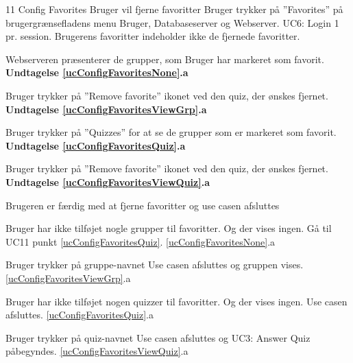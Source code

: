 
\uchead
	{11}
	{Config Favorites}
	{Bruger vil fjerne favoritter}
	{Bruger trykker på ''Favorites'' på brugergrænsefladens menu}
	{Bruger, Databaseserver og Webserver.}
	{UC6: Login}
	{1 pr. session.}
	{Brugerens favoritter indeholder ikke de fjernede favoritter.}

\item \label{ucConfigFavoritesNone} Webserveren præsenterer de  grupper, som Bruger har markeret som favorit.
\textbf{Undtagelse \ref{ucConfigFavoritesNone}.a}

\item \label{ucConfigFavoritesViewGrp}Bruger trykker på ''Remove favorite'' ikonet ved den quiz, der ønskes fjernet.
\textbf{Undtagelse \ref{ucConfigFavoritesViewGrp}.a}

\item \label{ucConfigFavoritesQuiz}Bruger trykker på ''Quizzes'' for at se de grupper som er markeret som favorit.
\textbf{Undtagelse \ref{ucConfigFavoritesQuiz}.a}

\item \label{ucConfigFavoritesViewQuiz}Bruger trykker på ''Remove favorite'' ikonet ved den quiz, der ønskes fjernet.
\textbf{Undtagelse \ref{ucConfigFavoritesViewQuiz}.a}

\item Brugeren er færdig med at fjerne favoritter og use casen afsluttes

\ucdescriptionend

\ucextension
	{Bruger har ikke tilføjet nogle grupper til favoritter. Og der vises ingen.}
	{Gå til UC11 punkt \ref{ucConfigFavoritesQuiz}.}
	{\ref{ucConfigFavoritesNone}.a}
		
\ucextension
	{Bruger trykker på gruppe-navnet}
	{Use casen afsluttes og gruppen vises.}
	{\ref{ucConfigFavoritesViewGrp}.a}		
		
\ucextension
			{Bruger har ikke tilføjet nogen quizzer til favoritter. Og der vises ingen.}
	{Use casen afsluttes.}
	{\ref{ucConfigFavoritesQuiz}.a}
	
\ucextension
	{Bruger trykker på quiz-navnet}
	{Use casen afsluttes og UC3: Answer Quiz påbegyndes.}
	{\ref{ucConfigFavoritesViewQuiz}.a}
		
